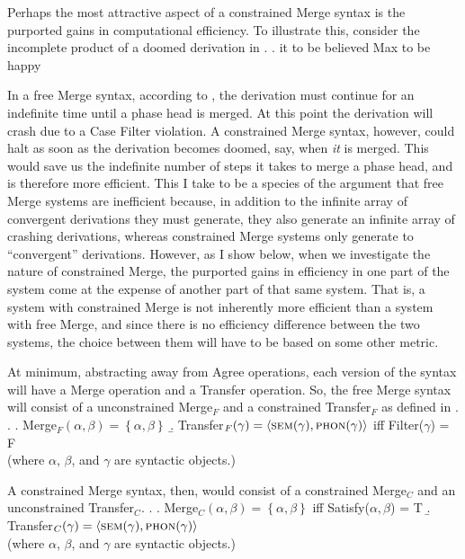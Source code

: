\documentclass[MilwayThesis]{subfiles}
\begin{document}
Perhaps the most attractive aspect of a constrained Merge syntax is the purported gains in computational efficiency.
To illustrate this, \textcite{frampton2008crash} consider the incomplete product of a doomed derivation in \Next.
\ex. it to be believed Max to be happy

In a free Merge syntax, according to \textcite{frampton2008crash}, the derivation must continue for an indefinite time until a phase head is merged.
At this point the derivation will crash due to a Case Filter violation.
A constrained Merge syntax, however, could halt as soon as the derivation becomes doomed, say, when \textit{it} is merged.
This would save us the indefinite number of steps it takes to merge a phase head, and is therefore more efficient.
This I take to be a species of the argument that free Merge systems are inefficient because, in addition to the infinite array of convergent derivations they must generate, they also generate an infinite array of crashing derivations, whereas constrained Merge systems only generate to ``convergent'' derivations.
However, as I show below, when we investigate the nature of constrained Merge, the purported gains in efficiency in one part of the system come at the expense of another part of that same system.
That is, a system with constrained Merge is not inherently more efficient than a system with free Merge, and since there is no efficiency difference between the two systems, the choice between them will have to be based on some other metric.

At minimum, abstracting away from Agree operations, each version of the syntax will have a Merge operation and a Transfer operation.
So, the free Merge syntax will consist of a unconstrained Merge$_F$ and a constrained Transfer$_F$ as defined in \Next.
\ex.
\a. Merge$_F(\alpha,\beta) = \left\{ \alpha, \beta \right\}$ 
\b. Transfer$_F(\gamma) = \langle\textsc{sem}(\gamma), \textsc{phon}(\gamma)\rangle$ iff Filter($\gamma$) = F\\
(where $\alpha$, $\beta$, and $\gamma$ are syntactic objects.)

A constrained Merge syntax, then, would consist of a constrained Merge$_C$ and an unconstrained Transfer$_C$.
\ex.
\a. Merge$_C(\alpha,\beta) =\left\{\alpha,\beta\right\}$ iff Satisfy($\alpha,\beta$) = T
\b. Transfer$_C(\gamma) = \langle\textsc{sem}(\gamma), \textsc{phon}(\gamma)\rangle$\\
(where $\alpha$, $\beta$, and $\gamma$ are syntactic objects.)
\end{document}
